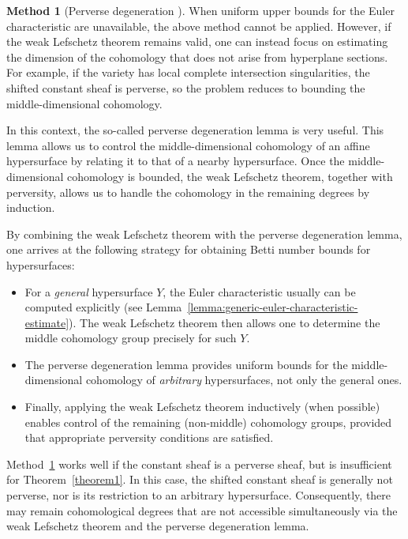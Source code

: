 \documentclass[english]{smfart}
\theoremstyle{remark}
\theoremstyle{plain}
\theoremstyle{definition}
\numberwithin{equation}{remark}
\theoremstyle{void}
\newtheorem{method}[remark]{Method}
\begin{document}
\begin{method}[Perverse degeneration \cite{wan-zhang_betti-number-bounds-for-varieties-and-exponential-sums0}]
\label{method:degeneration}
When uniform upper bounds for the Euler characteristic are
unavailable, the above method cannot be applied.  However, if the weak
Lefschetz theorem remains valid, one can instead focus on estimating
the dimension of the cohomology that does not arise from hyperplane
sections.  For example, if the variety has local complete intersection
singularities, the shifted constant sheaf is perverse, so the problem
reduces to bounding the middle-dimensional cohomology.

In this context, the so-called perverse degeneration lemma
\cite{katz_perverse-origin,wan-zhang_betti-number-bounds-for-varieties-and-exponential-sums0}
is very useful.  This lemma allows us to control the middle-dimensional
cohomology of an affine hypersurface by relating it to that of a nearby
hypersurface.  Once the middle-dimensional cohomology is bounded,
the weak Lefschetz theorem, together with perversity, allows us to
handle the cohomology in the remaining degrees by induction.

By combining the weak Lefschetz theorem with the perverse degeneration
lemma, one arrives at the following strategy for obtaining Betti number
bounds for hypersurfaces:
\begin{itemize}
\item For a \emph{general} hypersurface \(Y\), the Euler characteristic
usually can be computed explicitly (see Lemma~\ref{lemma:generic-euler-characteristic-estimate}).
The weak Lefschetz theorem then allows
one to determine the middle cohomology group precisely for such \(Y\).
\item The perverse degeneration lemma provides uniform bounds for the
middle-dimensional cohomology of \emph{arbitrary} hypersurfaces, not only
the general ones.
\item Finally, applying the weak Lefschetz theorem inductively (when possible)
enables control of the remaining (non-middle) cohomology groups, provided
that appropriate perversity conditions are satisfied.
\end{itemize}

Method~\ref{method:degeneration} works well if the constant sheaf is a
perverse sheaf, but is insufficient for Theorem~\ref{theorem1}.  In
this case, the shifted constant sheaf is generally not perverse, nor
is its restriction to an arbitrary hypersurface.  Consequently, there
may remain cohomological degrees that are not accessible
simultaneously via the weak Lefschetz theorem and the perverse
degeneration lemma.
\end{method}
\end{document}
